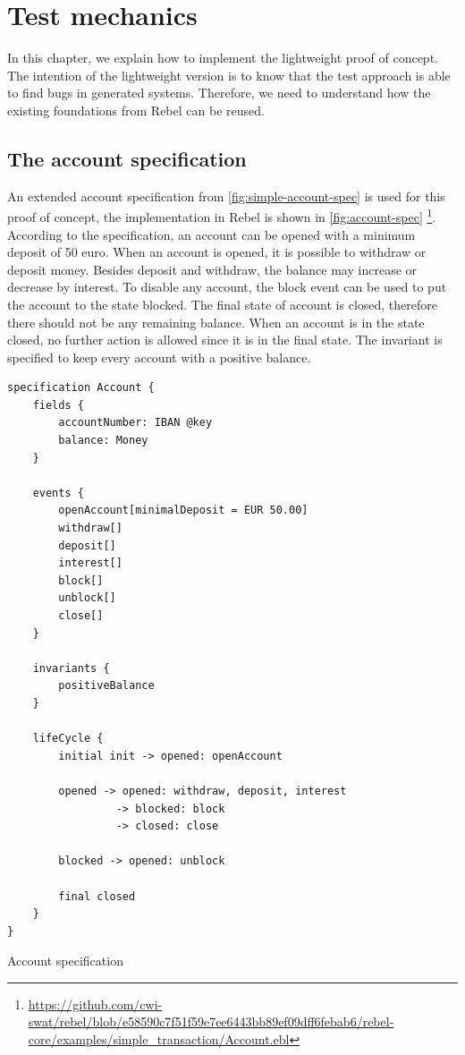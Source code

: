 \chapter{Test mechanics}
\label{sec:ch3}

In this chapter, we explain how to implement the lightweight proof of concept. The intention of the lightweight version is to know that the test approach is able to find bugs in generated systems. Therefore, we need to understand how the existing foundations from Rebel can be reused.



\section{The account specification}
An extended account specification from \autoref{fig:simple-account-spec} is used for this proof of concept, the implementation in Rebel is shown in \autoref{fig:account-spec} \footnote{\url{https://github.com/cwi-swat/rebel/blob/e58590c7f51f59e7ee6443bb89ef09dff6febab6/rebel-core/examples/simple_transaction/Account.ebl}}. According to the specification, an account can be opened with a minimum deposit of 50 euro. When an account is opened, it is possible to withdraw or deposit money. Besides deposit and withdraw, the balance may increase or decrease by interest. To disable any account, the block event can be used to put the account to the state blocked. The final state of account is closed, therefore there should not be any remaining balance. When an account is in the state closed, no further action is allowed since it is in the final state. The invariant is specified to keep every account with a positive balance.


\begin{sourcecode}[h!]
\begin{lstlisting}[]
specification Account {
	fields {
		accountNumber: IBAN @key
		balance: Money		
	}
	
	events { 
		openAccount[minimalDeposit = EUR 50.00]
		withdraw[]   
		deposit[] 
		interest[]   
		block[]  
		unblock[] 
		close[]
	} 
	 
	invariants {
		positiveBalance
	}
	
	lifeCycle {
		initial init -> opened: openAccount
		
		opened -> opened: withdraw, deposit, interest
			     -> blocked: block
			     -> closed: close
		
		blocked -> opened: unblock
		
		final closed		
	}
}
\end{lstlisting}
\caption{Account specification}
\label{fig:account-spec}
\end{sourcecode}

